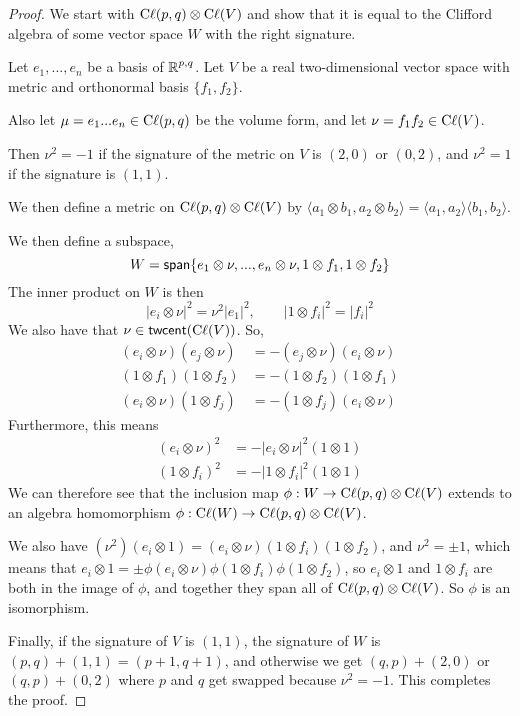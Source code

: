 \begin{proof}
We start with $\operatorname{C\ell}(p,q)\otimes \operatorname{C\ell}(V)$ and show that it is equal to the Clifford algebra of some vector space $W$ with the right signature.

    Let $e_1,...,e_n$ be a basis of $\operatorname{\mathbb{R}}^{p,q}$. Let $V$ be a real two-dimensional vector space with metric and orthonormal basis $\{f_1,f_2\}$. 
    
    Also let $\mu = e_1...e_n\in \operatorname{C\ell}(p,q)$ be the volume form, and let $\nu = f_1f_2 \in \operatorname{C\ell}(V)$.

    Then $\nu^2 = -1$ if the signature of the metric on $V$ is $(2,0)$ or $(0,2)$, and $\nu^2 = 1$ if the signature is $(1,1)$.
    
    We then define a metric on  $\operatorname{C\ell}(p,q)\otimes \operatorname{C\ell}(V)$ by $\langle a_1\otimes b_1,a_2\otimes b_2\rangle = \langle a_1,a_2\rangle\langle b_1,b_2\rangle$.

    We then define a subspace,
    \[W = \operatorname{\textsf{span}}\{e_1\otimes \nu,...,e_n\otimes \nu, 1\otimes f_1,1\otimes f_2\}\]
    The inner product on $W$ is then
    \[|e_i\otimes\nu|^2 = \nu^2|e_1|^2,\qquad |1\otimes f_i|^2 = |f_i|^2\]
    We also have that $\nu \in \operatorname{\textsf{twcent}}(\operatorname{C\ell}(V))$. So,
    \begin{align*}
        (e_i\otimes \nu)(e_j\otimes \nu) &= -(e_j\otimes\nu)(e_i\otimes \nu)\\
        (1\otimes f_1) (1\otimes f_2)&=-(1\otimes f_2)(1\otimes f_1)\\
        (e_i\otimes \nu)(1\otimes f_j)&=-(1\otimes f_j)(e_i\otimes \nu)
    \end{align*}
    Furthermore, this means
    \begin{align*}
        (e_i\otimes \nu)^2 &= -|e_i\otimes\nu|^2(1\otimes 1)\\
        (1\otimes f_i)^2 &= -|1\otimes f_i|^2(1\otimes 1)
    \end{align*}
    We can therefore see that the inclusion map $\phi : W \to \operatorname{C\ell}(p,q)\otimes \operatorname{C\ell}(V)$ extends to an algebra homomorphism $\phi :\operatorname{C\ell}(W)\to\operatorname{C\ell}(p,q)\otimes\operatorname{C\ell}(V)$.

    We also have $(\nu^2)(e_i\otimes 1) = (e_i\otimes\nu)(1\otimes f_i)(1\otimes f_2)$, and $\nu^2 = \pm 1$, which means that $e_i\otimes 1 = \pm \phi(e_i\otimes\nu)\phi(1\otimes f_i)\phi(1\otimes f_2)$, so $e_i \otimes 1$ and $1\otimes f_i$ are both in the image of $\phi$, and together they span all of $\operatorname{C\ell}(p,q)\otimes \operatorname{C\ell}(V)$. So $\phi$ is an isomorphism.

    Finally, if the signature of $V$ is $(1,1)$, the signature of $W$ is $(p,q)+(1,1) = (p+1,q+1)$, and otherwise we get $(q,p) + (2,0)$ or $(q,p)+(0,2)$ where $p$ and $q$ get swapped because $\nu^2=-1$. This completes the proof.
\end{proof}
